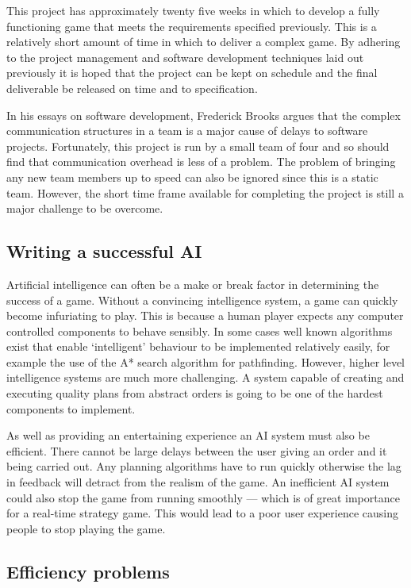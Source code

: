 This project has approximately twenty five weeks in which to develop a fully functioning
game that meets the requirements specified previously. This is a relatively short amount
of time in which to deliver a complex game. By adhering to the project management
and software development techniques laid out previously it is hoped that the project
can be kept on schedule and the final deliverable be released on time and to specification.

In his essays on software development, Frederick Brooks argues that the complex
communication structures in a team is a major cause of delays to software projects.\cite{brooks1995}
Fortunately, this project is run by a small team of four and so should find that
communication overhead is less of a problem. The problem of bringing any new team
members up to speed can also be ignored since this is a static team.
However, the short time frame available for completing the project is still a
major challenge to be overcome.

\subsection{Writing a successful AI}

Artificial intelligence can often be a make or break factor in determining the success of
a game. Without a convincing intelligence system, a game can
quickly become infuriating to play. This is because a human player expects any computer
controlled components to behave sensibly. In some cases well known algorithms exist that
enable `intelligent' behaviour to be implemented relatively easily, for example the use
of the A* search algorithm for pathfinding. However, higher level intelligence systems
are much more challenging. A system capable of creating and executing quality plans
from abstract orders is going to be one of the hardest components to implement.

As well as providing an entertaining experience an AI system must also be efficient.
There cannot be large delays between the user giving an order and it being carried
out. Any planning algorithms have to run quickly otherwise the lag in feedback will
detract from the realism of the game. An inefficient AI system could also stop the game
from running smoothly --- which is of great importance for a real-time strategy game.
This would lead to a poor user experience causing people to stop playing the game.

\subsection{Efficiency problems}

